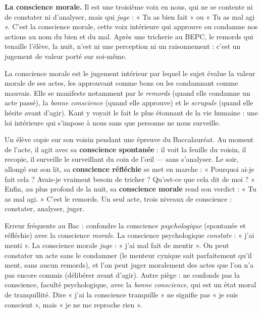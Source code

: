\documentclass[11pt]{article}
\newcommand{\cle}[1]{{\popxbold\color{popdark}#1}}
\begin{document}
\textbf{La conscience morale.} Il est une troisième voix en nous, qui ne se contente ni de constater ni d'analyser, mais qui \emph{juge} : « Tu as bien fait » ou « Tu as mal agi ». C'est la conscience morale, cette voix intérieure qui approuve ou condamne nos actions au nom du bien et du mal. Après une tricherie au BEPC, le remords qui tenaille l'élève, la nuit, n'est ni une perception ni un raisonnement : c'est un jugement de valeur porté sur soi-même.

\begin{definition}
La \cle{conscience morale} est le jugement intérieur par lequel le sujet évalue la valeur morale de ses actes, les approuvant comme bons ou les condamnant comme mauvais. Elle se manifeste notamment par le \emph{remords} (quand elle condamne un acte passé), la \emph{bonne conscience} (quand elle approuve) et le \emph{scrupule} (quand elle hésite avant d'agir). Kant y voyait le fait le plus étonnant de la vie humaine : une loi intérieure qui s'impose à nous sans que personne ne nous surveille.
\end{definition}

\begin{exemplebox}
Un élève copie sur son voisin pendant une épreuve du Baccalauréat. Au moment de l'acte, il agit avec sa \textbf{conscience spontanée} : il voit la feuille du voisin, il recopie, il surveille le surveillant du coin de l'œil — sans s'analyser. Le soir, allongé sur son lit, sa \textbf{conscience réfléchie} se met en marche : « Pourquoi ai-je fait cela ? Avais-je vraiment besoin de tricher ? Qu'est-ce que cela dit de moi ? » Enfin, au plus profond de la nuit, sa \textbf{conscience morale} rend son verdict : « Tu as mal agi. » C'est le remords. Un seul acte, trois niveaux de conscience : constater, analyser, juger.
\end{exemplebox}

\begin{attention}
Erreur fréquente au Bac : confondre la conscience \emph{psychologique} (spontanée et réfléchie) avec la conscience \emph{morale}. La conscience psychologique \emph{constate} : « j'ai menti ». La conscience morale \emph{juge} : « j'ai mal fait de mentir ». On peut constater un acte sans le condamner (le menteur cynique sait parfaitement qu'il ment, sans aucun remords), et l'on peut juger moralement des actes que l'on n'a pas encore commis (délibérer avant d'agir). Autre piège : ne confonds pas la conscience, faculté psychologique, avec la \emph{bonne conscience}, qui est un état moral de tranquillité. Dire « j'ai la conscience tranquille » ne signifie pas « je suis conscient », mais « je ne me reproche rien ».
\end{attention}
\end{document}
